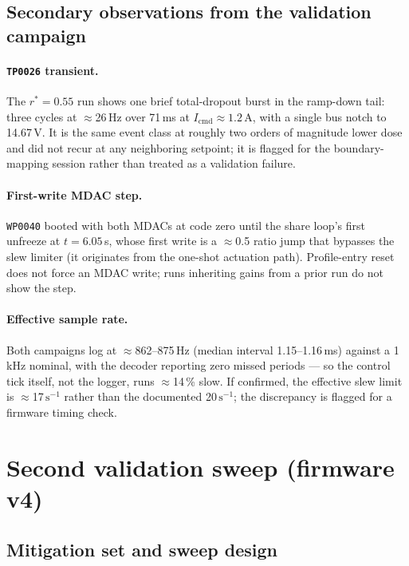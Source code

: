 \documentclass[11pt]{article}
\newcommand{\code}[1]{\texttt{#1}}
\begin{document}
\subsection{Secondary observations from the validation campaign}

\paragraph{\code{TP0026} transient.} The $r^\ast=0.55$ run shows one brief
total-dropout burst in the ramp-down tail: three cycles at $\approx$26\,Hz over
71\,ms at $I_\mathrm{cmd}\approx1.2$\,A, with a single bus notch to 14.67\,V. It is
the same event class at roughly two orders of magnitude lower dose and did not
recur at any neighboring setpoint; it is flagged for the boundary-mapping session
rather than treated as a validation failure.

\paragraph{First-write MDAC step.} \code{WP0040} booted with both MDACs at code
zero until the share loop's first unfreeze at $t=6.05$\,s, whose first write is a
$\approx$0.5 ratio jump that bypasses the slew limiter (it originates from the
one-shot actuation path). Profile-entry reset does not force an MDAC write; runs
inheriting gains from a prior run do not show the step.

\paragraph{Effective sample rate.} Both campaigns log at $\approx$862--875\,Hz
(median interval 1.15--1.16\,ms) against a 1\,kHz nominal, with the decoder
reporting zero missed periods --- so the control tick itself, not the logger, runs
$\approx$14\,\% slow. If confirmed, the effective slew limit is $\approx$17\,$\mathrm{s^{-1}}$
rather than the documented 20\,$\mathrm{s^{-1}}$; the discrepancy is flagged for a
firmware timing check.

\section{Second validation sweep (firmware v4)}
\label{sec:v4}

\subsection{Mitigation set and sweep design}
\end{document}
